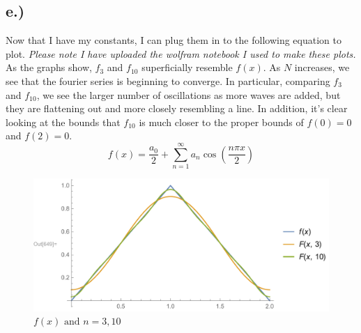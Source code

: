 \documentclass{article}
\begin{document}
\subsection*{e.)}
Now that I have my constants, I can plug them in to the following equation to plot. \textit{Please note I have uploaded the wolfram notebook I used to make these plots.} As the graphs show, $f_3$ and $f_{10}$ superficially resemble $f(x)$. As $N$ increases, we see that the fourier series is beginning to converge. In particular, comparing $f_3$ and $f_{10}$, we see the larger number of oscillations as more waves are added, but they are flattening out and more closely resembling a line. In addition, it's clear looking at the bounds that $f_{10}$ is much closer to the proper bounds of $f(0) = 0$ and $f(2) = 0$.
\begin{equation}
f(x) = \frac{a_0}{2} + \sum_{n=1}^{\infty} a_n\cos(\frac{n\pi x}{2})
\end{equation}
\begin{figure}[H]
  \centering
    \includegraphics[width=\textwidth, scale = 1.25]{hw_9_plots.pdf}
    \caption{$f(x) \text{ and } n = 3, 10$}
\end{figure}
\end{document}
